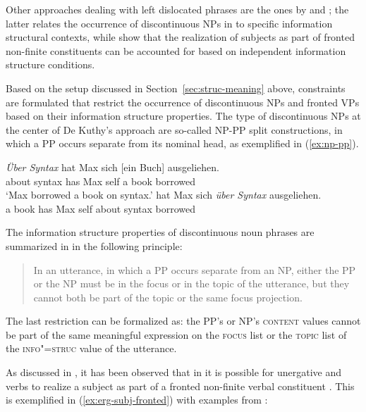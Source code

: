 \documentclass[output=paper
 	        ,biblatex
                ,babelshorthands
                ,newtxmath
                ,draftmode
                ,colorlinks, citecolor=brown
]{langscibook}
\begin{document}
Other approaches dealing with left dislocated phrases are the ones by
\cite{deKuthy2002a} and \citet{dKM2003a}; the latter relates the
occurrence of discontinuous NPs in  to specific
information structural contexts, while \citet{dKM2003a} show that the
realization of subjects as part of fronted non-finite constituents can
be accounted for based on independent information structure
conditions.

Based on the setup discussed in Section~\ref{sec:struc-meaning} above,
constraints are formulated that restrict the occurrence of
discontinuous NPs and fronted VPs based on their information structure
properties. The type of discontinuous NPs at the center of De
Kuthy's approach are so-called NP-PP split constructions, in which a PP
occurs separate from its nominal head, as exemplified in
(\ref{ex:np-pp}).

\begin{exe}
  \ex\label{ex:np-pp} \begin{xlist}
    \ex\label{ex:simple-fronted-pp}\gll \textsl{Über Syntax} hat Max sich [ein
 Buch] ausgeliehen.\\
         {about syntax} has Max self { a} book borrowed\\
       \trans `Max borrowed a book on syntax.'
    \ex\label{ex:simple-fronted-np} hat Max sich \textsl{über Syntax}    ausgeliehen.\\
 \spacebr{}a book has Max self {about syntax} borrowed\\
\end{xlist}
\end{exe}

The information structure properties of discontinuous noun phrases are
summarized in \citet[176]{deKuthy2002a} in the following principle:
\begin{quote}
  In an utterance, in which a PP occurs separate from an NP, either
  the PP or the NP must be in the focus or in the topic of the
  utterance, but they cannot both be part of the topic or the same
  focus projection. \citep[176]{deKuthy2002a}
\end{quote}

The last restriction can be formalized as: the PP's or NP's
\textsc{content} values cannot be part of the same
meaningful expression on the \textsc{focus} list or the \textsc{topic}
list of the \textsc{info"=struc} value of the utterance.

As discussed in \cite{dKM2003a}, it has been observed that in
 it is possible for unergative and  verbs to
realize a subject as part of a fronted non-finite verbal
constituent \citep{Haider90a}. This is exemplified in (\ref{ex:erg-subj-fronted}) with examples from \citet[94]{Haider90-ohne-crossref}:
\end{document}
